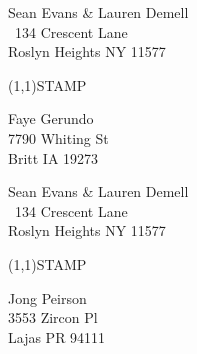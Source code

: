 \documentclass[12pt]{article}
\begin{document}
\clearpage

\begin{minipage}{.5\linewidth} \noindent
Sean Evans \& Lauren Demell\\\ 
134 Crescent Lane\\ 
Roslyn Heights NY 11577
\end{minipage}
\begin{minipage}{.5\linewidth \hspace{-.2in} \vspace{-.3in}}
\begin{flushright}
\framebox(1,1){STAMP}
\end{flushright}
\end{minipage}

\begin{center} \begin{Huge} \vspace*{\fill}
Faye Gerundo\\
7790 Whiting St\\
Britt IA 19273\\
\vspace{\fill} \end{Huge} \end{center}

\clearpage

\begin{minipage}{.5\linewidth} \noindent
Sean Evans \& Lauren Demell\\\ 
134 Crescent Lane\\ 
Roslyn Heights NY 11577
\end{minipage}
\begin{minipage}{.5\linewidth \hspace{-.2in} \vspace{-.3in}}
\begin{flushright}
\framebox(1,1){STAMP}
\end{flushright}
\end{minipage}

\begin{center} \begin{Huge} \vspace*{\fill}
Jong Peirson\\
3553 Zircon Pl\\
Lajas PR 94111\\
\vspace{\fill} \end{Huge} \end{center}

\clearpage
\end{document}
